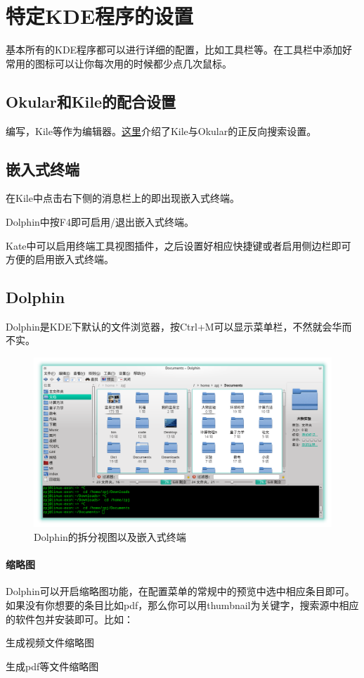 \section{特定KDE程序的设置}
基本所有的KDE程序都可以进行详细的配置，比如工具栏等。在工具栏中添加好常用的图标可以让你每次用的时候都少点几次鼠标。
\subsection{Okular和Kile的配合设置}
编写，Kile等作为编辑器。\href{http://zpj.blog.ustc.edu.cn/?p=338}{这里}介绍了Kile与Okular的正反向搜索设置。

\subsection{嵌入式终端}
在Kile中点击右下侧的消息栏上的即出现嵌入式终端。

Dolphin中按F4即可启用/退出嵌入式终端。

Kate中可以启用终端工具视图插件，之后设置好相应快捷键或者启用侧边栏即可方便的启用嵌入式终端。
\subsection{Dolphin}
Dolphin是KDE下默认的文件浏览器，按Ctrl+M可以显示菜单栏，不然就会华而不实。
\begin{figure}[htbp!]
\centering
\includegraphics[width=\textwidth]{./pic/dolphin.png} 
\caption{Dolphin的拆分视图以及嵌入式终端}
\end{figure}

\paragraph{缩略图} Dolphin可以开启缩略图功能，在配置菜单的常规中的预览中选中相应条目即可。如果没有你想要的条目比如pdf，那么你可以用thumbnail为关键字，搜索源中相应的软件包并安装即可。比如：
\begin{compactenum}
 \item {} 生成视频文件缩略图
 \item {} 生成pdf等文件缩略图
\end{compactenum}
